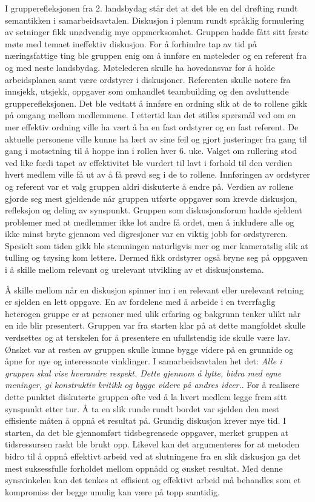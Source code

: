 I grupperefleksjonen fra 2. landsbydag står det at det ble en del drøfting rundt semantikken i samarbeidsavtalen. 
Diskusjon i plenum rundt språklig formulering av setninger fikk unødvendig mye oppmerksomhet.
Gruppen hadde fått sitt første møte med temaet ineffektiv diskusjon.
For å forhindre tap av tid på næringsfattige ting ble gruppen enig om å innføre en møteleder og en referent fra og med neste landsbydag.
Møtelederen skulle ha hovedansvar for å holde arbeidsplanen samt være ordstyrer i diskusjoner.
Referenten skulle notere fra innsjekk, utsjekk, oppgaver som omhandlet teambuilding og den avsluttende grupperefleksjonen.
Det ble vedtatt å innføre en ordning slik at de to rollene gikk på omgang mellom medlemmene.
I ettertid kan det stilles spørsmål ved om en mer effektiv ordning ville ha vært å ha en fast ordstyrer og en fast referent.
De aktuelle personene ville kunne ha lært av sine feil og gjort justeringer fra gang til gang i motsetning til å hoppe inn i rollen hver 6. uke.
Valget om rullering stod ved like fordi tapet av effektivitet ble vurdert til lavt i forhold til den verdien hvert medlem ville få ut av å få prøvd seg i de to rollene.
Innføringen av ordstyrer og referent var et valg gruppen aldri diskuterte å endre på. 
Verdien av rollene gjorde seg mest gjeldende når gruppen utførte oppgaver som krevde diskusjon, refleksjon og deling av synspunkt.
Gruppen som diskusjonsforum hadde sjeldent problemer med at medlemmer ikke lot andre få ordet, men å inkludere alle og ikke minst bryte gjennom ved digresjoner var en viktig jobb for ordstyreren. 
Spesielt som tiden gikk ble stemningen naturligvis mer og mer kameratslig slik at tulling og tøysing kom lettere.
Dermed fikk ordstyrer også bryne seg på oppgaven i å skille mellom relevant og urelevant utvikling av et diskusjonstema.

Å skille mellom når en diskusjon spinner inn i en relevant eller urelevant retning er sjelden en lett oppgave.
En av fordelene med å arbeide i en tverrfaglig heterogen gruppe er at personer med ulik erfaring og bakgrunn tenker ulikt når en ide blir presentert.
Gruppen var fra starten klar på at dette mangfoldet skulle verdsettes og at terskelen for å presentere en ufullstendig ide skulle være lav.
Ønsket var at resten av gruppen skulle kunne bygge videre på en grunnide og åpne for nye og interessante vinklinger. 
I samarbeidsavtalen het det: \textit{Alle i gruppen skal vise hverandre respekt. Dette gjennom å lytte, bidra med egne meninger, gi konstruktiv kritikk og bygge videre på andres ideer.}.
For å realisere dette punktet diskuterte gruppen ofte ved å la hvert medlem legge frem sitt synspunkt etter tur.
Å ta en slik runde rundt bordet var sjelden den mest effisiente måten å oppnå et resultat på.
Grundig diskusjon krever mye tid. 
I starten, da det ble gjennomført tidsbegrensede oppgaver, merket gruppen at tidsressursen raskt ble brukt opp.
Likevel kan det argumenteres for at metoden bidro til å oppnå effektivt arbeid ved at slutningene fra en slik diskusjon ga det mest suksessfulle forholdet mellom oppnådd og ønsket resultat.
Med denne synsvinkelen kan det tenkes at effisient og effektivt arbeid må behandles som et kompromiss der begge umulig kan være på topp samtidig.

